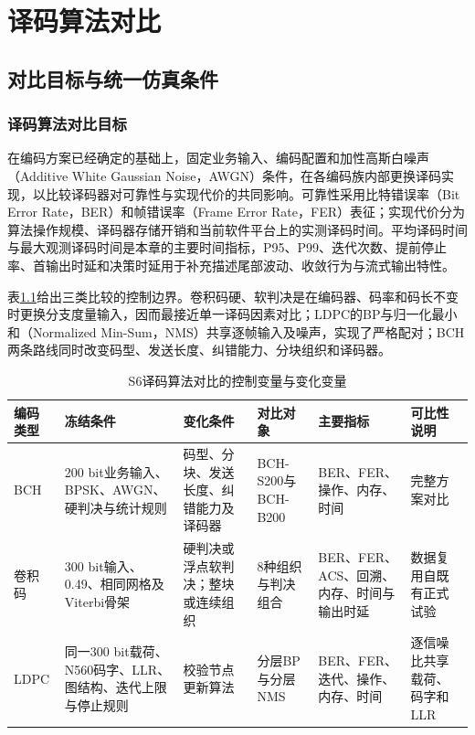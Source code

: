 \chapter{译码算法对比}\label{chap:decoder}

\section{对比目标与统一仿真条件}

\subsection{译码算法对比目标}

在编码方案已经确定的基础上，固定业务输入、编码配置和加性高斯白噪声（Additive White Gaussian Noise，AWGN）条件，在各编码族内部更换译码实现，以比较译码器对可靠性与实现代价的共同影响。可靠性采用比特错误率（Bit Error Rate，BER）和帧错误率（Frame Error Rate，FER）表征；实现代价分为算法操作规模、译码器存储开销和当前软件平台上的实测译码时间。平均译码时间与最大观测译码时间是本章的主要时间指标，P95、P99、迭代次数、提前停止率、首输出时延和决策时延用于补充描述尾部波动、收敛行为与流式输出特性。

表\ref{tab:s6-control-variables}给出三类比较的控制边界。卷积码硬、软判决是在编码器、码率和码长不变时更换分支度量输入，因而最接近单一译码因素对比；LDPC的BP与归一化最小和（Normalized Min-Sum，NMS）共享逐帧输入及噪声，实现了严格配对；BCH两条路线同时改变码型、发送长度、纠错能力、分块组织和译码器。

\begin{table}[htbp]
  \centering
  \scriptsize
  \caption{S6译码算法对比的控制变量与变化变量}
  \label{tab:s6-control-variables}
  \setlength{\tabcolsep}{2.0pt}
  \begin{tabular}{p{}p{}p{}p{}p{}p{}}
    \toprule
    编码类型 & 冻结条件 & 变化条件 & 对比对象 & 主要指标 & 可比性说明 \\
    \midrule
    BCH & 200 bit业务输入、BPSK、AWGN、硬判决与统计规则 & 码型、分块、发送长度、纠错能力及译码器 & BCH-S200与BCH-B200 & BER、FER、操作、内存、时间 & 完整方案对比 \\
    卷积码 & 300 bit输入、0.49、相同网格及Viterbi骨架 & 硬判决或浮点软判决；整块或连续组织 & 8种组织与判决组合 & BER、FER、ACS、回溯、内存、时间与输出时延 & 数据复用自既有正式试验\\
    LDPC & 同一300 bit载荷、N560码字、LLR、图结构、迭代上限与停止规则 & 校验节点更新算法 & 分层BP与分层NMS & BER、FER、迭代、操作、内存、时间 & 逐信噪比共享载荷、码字和LLR \\
    \bottomrule
  \end{tabular}
\end{table}

